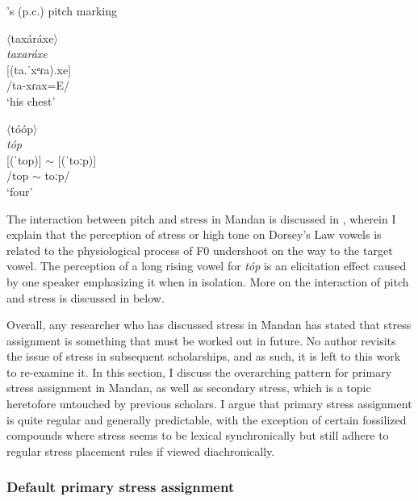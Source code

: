 \begin{exe}
\item\label{indrekmandanpitch} \citeauthor{park2012}'s (p.c.) pitch marking

\begin{xlist}
\item $\langle$taxáráxe$\rangle$\\
	\textit{taxaráxe}\\
 	{[}(ta.ˈxᵃɾa).xe]\\
	/ta-xɾax=E/\\
	`his chest'

\item $\langle$tóóp$\rangle$\\
	\textit{tóp}\\
  	{[}(ˈtop)] $\sim$ [(ˈtoːp)]\\
	/top $\sim$ toːp/\\
	`four'
\end{xlist}

\end{exe}

The interaction between pitch and stress in Mandan is discussed in , wherein I explain that the perception of stress or high tone on Dorsey's Law vowels is related to the physiological process of F0 undershoot on the way to the target vowel. The perception of a long rising vowel for \textit{tóp} is an elicitation effect caused by one speaker emphasizing it when in isolation. More on the interaction of pitch and stress is discussed in  below.

Overall, any researcher who has discussed stress in Mandan has stated that stress assignment is something that must be worked out in future. No author revisits the issue of stress in subsequent scholarships, and as such, it is left to this work to re-examine it. In this section, I discuss the overarching pattern for primary stress assignment in Mandan, as well as secondary stress, which is a topic heretofore untouched by previous scholars. I argue that primary stress assignment is quite regular and generally predictable, with the exception of certain fossilized compounds where stress seems to be lexical synchronically but still adhere to regular stress placement rules if viewed diachronically.

\subsubsection{Default primary stress assignment}\label{primarystress}

